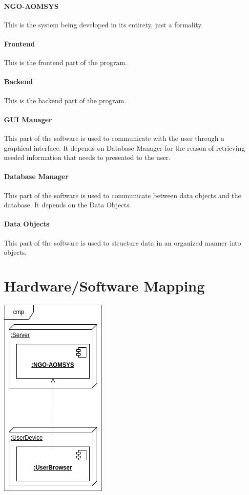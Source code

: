 \documentclass[a4paper,12pt]{report}
\begin{document}
			\paragraph{NGO-AOMSYS} This is the system being developed in its entirety, just a formality.
			\paragraph{Frontend} This is the frontend part of the program.
			\paragraph{Backend} This is the backend part of the program.
			\paragraph{GUI Manager} This part of the software is used to communicate with the user through a graphical interface. It depends on Database Manager for the reason of retrieving needed information that needs to presented to the user.
			\paragraph{Database Manager} This part of the software is used to communicate between data objects and the database. It depends on the Data Objects.
			\paragraph{Data Objects} This part of the software is used to structure data in an organized manner into objects.
		\section{Hardware/Software Mapping}
			\includegraphics{hardware_software_mapping.png}
\end{document}
